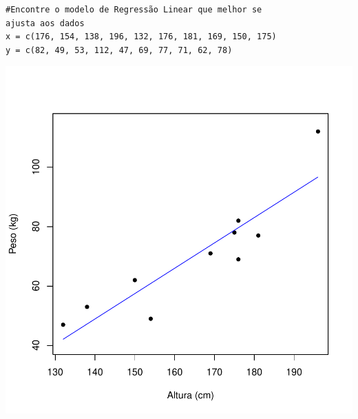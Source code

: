 \documentclass[14pt,aspectratio=1610]{beamer}
\begin{document}
\begin{frame}[fragile]{}
\frametitle{ }
\begin{block}{}
\begin{center}
\begin{verbatim}
#Encontre o modelo de Regressão Linear que melhor se
ajusta aos dados
x = c(176, 154, 138, 196, 132, 176, 181, 169, 150, 175)
y = c(82, 49, 53, 112, 47, 69, 77, 71, 62, 78)    
\end{verbatim}
\end{center}
\end{block}
\vspace{-1.3cm}
\begin{center}
\includegraphics{Figuras/Aula20-008}
\end{center}
\end{frame}
\end{document}
